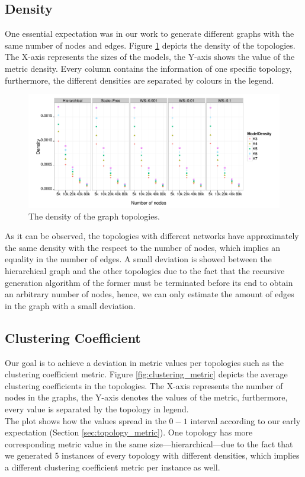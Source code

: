 \subsection{Density}
One essential expectation was in our work to generate different graphs with the same number of nodes and edges. Figure \ref{fig:density} depicts the density of the topologies. The X-axis represents the sizes of the models, the Y-axis shows the value of the metric density. Every column contains the information of one specific topology, furthermore, the different densities are separated by colours in the legend.
\begin{figure}[!ht]
	\centering
	\includegraphics[width=160mm, keepaspectratio]{figures/density.pdf}
	\caption{The density of the graph topologies.}
	\label{fig:density}
\end{figure}

As it can be observed, the topologies with different networks have approximately the same density with the respect to the number of nodes, which implies an equality in the number of edges. A small deviation is showed between the hierarchical graph and the other topologies due to the fact that the recursive generation algorithm of the former must be terminated before its end to obtain an arbitrary number of nodes, hence, we can only estimate the amount of edges in the graph with a small deviation.

\subsection{Clustering Coefficient}

Our goal is to achieve a deviation in metric values per topologies such as the clustering coefficient metric. Figure \ref{fig:clustering_metric} depicts the average clustering coefficients in the topologies. The X-axis represents the number of nodes in the graphs, the Y-axis denotes the values of the metric, furthermore, every value is separated by the topology in legend.\\
The plot shows how the values spread in the $0-1$ interval according to our early expectation (Section \ref{sec:topology_metric}). One topology has more corresponding metric value in the same size---\eg hierarchical---due to the fact that we generated 5 instances of every topology with different densities, which implies a different clustering coefficient metric per instance as well.

